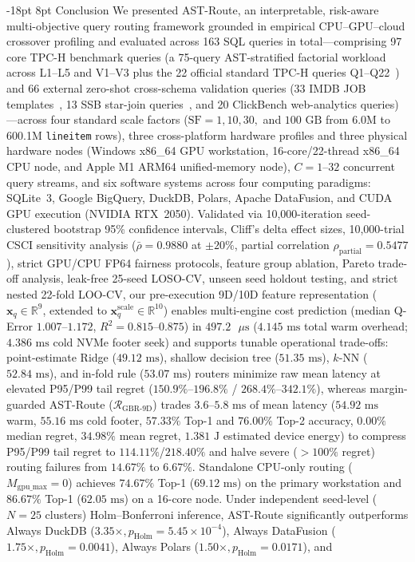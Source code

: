 \documentclass[10pt,a4paper]{article}
\makeatletter
\renewcommand\section{\@startsection{section}{1}{\z@}%
  {-18pt \@plus -4pt \@minus -2pt}%
  {8pt \@plus 2pt}%
  {\normalfont\large\bfseries}}
\makeatother
\begin{document}
\section{Conclusion}
We presented AST-Route, an interpretable, risk-aware multi-objective query routing framework grounded in empirical CPU--GPU--cloud crossover profiling and evaluated across 163 SQL queries in total---comprising 97 core TPC-H benchmark queries (a 75-query AST-stratified factorial workload across L1--L5 and V1--V3 plus the 22 official standard TPC-H queries Q1--Q22~\cite{tpc2022tpch}) and 66 external zero-shot cross-schema validation queries (33 IMDB JOB templates~\cite{leis2015job}, 13 SSB star-join queries~\cite{oneil2009ssb}, and 20 ClickBench web-analytics queries)---across four standard scale factors ($\text{SF}=1, 10, 30,$ and $100\text{ GB}$ from 6.0M to 600.1M \texttt{lineitem} rows), three cross-platform hardware profiles and three physical hardware nodes (Windows x86\_64 GPU workstation, 16-core/22-thread x86\_64 CPU node, and Apple M1 ARM64 unified-memory node), $C=1\text{--}32$ concurrent query streams, and six software systems across four computing paradigms: SQLite~3, Google BigQuery, DuckDB, Polars, Apache DataFusion, and CUDA GPU execution (NVIDIA RTX~2050). Validated via 10,000-iteration seed-clustered bootstrap 95\% confidence intervals, Cliff's delta effect sizes, 10,000-trial CSCI sensitivity analysis ($\bar{\rho}=0.9880$ at $\pm 20\%$, partial correlation $\rho_{\text{partial}}=0.5477$), strict GPU/CPU FP64 fairness protocols, feature group ablation, Pareto trade-off analysis, leak-free 25-seed LOSO-CV, unseen seed holdout testing, and strict nested 22-fold LOO-CV, our pre-execution 9D/10D feature representation ($\mathbf{x}_q\in\mathbb{R}^9$, extended to $\mathbf{x}_q^{\text{scale}}\in\mathbb{R}^{10}$) enables multi-engine cost prediction (median Q-Error $1.007\text{--}1.172$, $R^2=0.815\text{--}0.875$) in $497.2\text{ }\mu\text{s}$ ($4.145\text{ ms}$ total warm overhead; $4.386\text{ ms}$ cold NVMe footer seek) and supports tunable operational trade-offs: point-estimate Ridge ($49.12\text{ ms}$), shallow decision tree ($51.35\text{ ms}$), $k$-NN ($52.84\text{ ms}$), and in-fold rule ($53.07\text{ ms}$) routers minimize raw mean latency at elevated P95/P99 tail regret ($150.9\%\text{--}196.8\%$ / $268.4\%\text{--}342.1\%$), whereas margin-guarded AST-Route ($\mathcal{R}_{\text{GBR-9D}}$) trades $3.6\text{--}5.8\text{ ms}$ of mean latency ($54.92\text{ ms}$ warm, $55.16\text{ ms}$ cold footer, $57.33\%$ Top-1 and $76.00\%$ Top-2 accuracy, $0.00\%$ median regret, $34.98\%$ mean regret, $1.381\text{ J}$ estimated device energy) to compress P95/P99 tail regret to $114.11\%$/$218.40\%$ and halve severe ($>100\%$ regret) routing failures from $14.67\%$ to $6.67\%$. Standalone CPU-only routing ($M_{\text{gpu\_max}}=0$) achieves $74.67\%$ Top-1 ($69.12\text{ ms}$) on the primary workstation and $86.67\%$ Top-1 ($62.05\text{ ms}$) on a 16-core node. Under independent seed-level ($N=25$ clusters) Holm--Bonferroni inference, AST-Route significantly outperforms Always DuckDB ($3.35\times, p_{\text{Holm}}=5.45\times 10^{-4}$), Always DataFusion ($1.75\times, p_{\text{Holm}}=0.0041$), Always Polars ($1.50\times, p_{\text{Holm}}=0.0171$), and 
\end{document}
